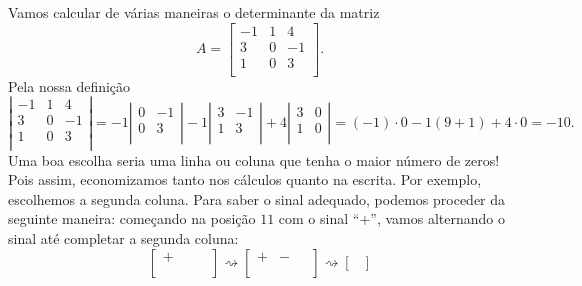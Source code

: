 \begin{ex}
Vamos calcular de várias maneiras o determinante da matriz
\begin{equation}
A =
\begin{bmatrix}
-1 & 1 & 4 \\
 3 & 0 & -1 \\
 1 & 0 & 3 \\
\end{bmatrix}.
\end{equation} Pela nossa definição
\begin{equation}
\left|
\begin{matrix}
-1 & 1 & 4 \\
3 & 0 & -1 \\
1 & 0 & 3 \\
\end{matrix}
\right| =
-1 \left|
\begin{matrix}
 0 & -1 \\
 0 & 3 \\
\end{matrix}
\right| - 1 \left|
\begin{matrix}
3  & -1 \\
1  & 3 \\
\end{matrix}
\right| + 4
\left|
\begin{matrix}
3 & 0  \\
1 & 0  \\
\end{matrix}
\right| = (-1)\cdot 0 - 1 (9 + 1) + 4 \cdot 0 = -10.
\end{equation} Uma boa escolha seria uma linha ou coluna que tenha o maior número de zeros! Pois assim, economizamos tanto nos cálculos quanto na escrita. Por exemplo, escolhemos a segunda coluna. Para saber o sinal adequado, podemos proceder da seguinte maneira: começando na posição $11$ com o sinal ``$+$'', vamos alternando o sinal até completar a segunda coluna:
\begin{equation}
\begin{bmatrix}
+ & \,\,  & \,\,  \\
  &  &   \\
  &  &
\end{bmatrix} \rightsquigarrow
\begin{bmatrix}
+ & - & \,\,  \\
\,\,& \,\, & \,\,  \\
\,\,& \,\, &  \,\,
\end{bmatrix}\rightsquigarrow
\begin{bmatrix}

\end{bmatrix}
\end{equation}
\end{ex}
